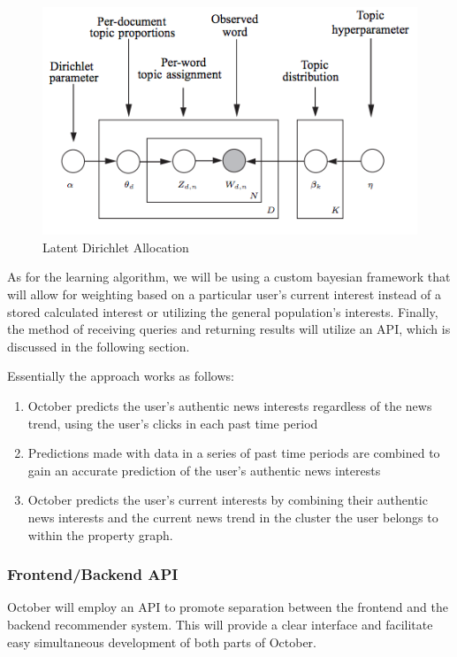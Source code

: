\documentclass[11pt,letterpaper]{article}
\begin{document}
\begin{figure}
\centering
\includegraphics[scale=0.65]{img/lda.png}
\caption{Latent Dirichlet Allocation}
\label{fig:lda}
\end{figure}

As for the learning algorithm, we will be using a custom
bayesian framework \cite{bayesian} that will allow for weighting based on a particular user's current interest instead of a stored calculated interest or utilizing the general population's interests.
Finally, the method of receiving queries and returning results will utilize an API, which is discussed in the following section.

Essentially the approach works as follows:
    \begin{enumerate}
        \item October predicts the user’s authentic news interests regardless of the news trend, using the user’s clicks in each past time period
        \item Predictions made with data in a series of past time periods are combined to gain an accurate prediction of the user’s authentic news interests
        \item October predicts the user’s current interests by combining their authentic news interests and the current news trend in the cluster the user belongs to within the property graph.
    \end{enumerate}

\subsubsection{Frontend/Backend API}
\label{sec:api}
October will employ an API to promote separation between the frontend and the backend recommender system.
This will provide a clear interface and facilitate easy simultaneous development of both parts of October.
\end{document}
